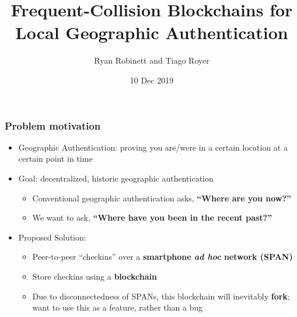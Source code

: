 \documentclass{beamer}
\begin{document}
\captionsetup{font=scriptsize, labelfont=scriptsize}

\title{Frequent-Collision Blockchains for Local Geographic Authentication}
\author{Ryan Robinett and Tiago Royer}
\date{10 Dec 2019}

\begin{frame}
    \titlepage
\end{frame}

\begin{frame}
	\frametitle{Problem motivation}

	\begin{itemize}
		\item Geographic Authentication:
			proving you are/were in a certain location
			at a certain point in time
		\item Goal: decentralized, historic geographic authentication
			\begin{itemize}
				\item Conventional geographic authentication asks, \textbf{``Where are you now?''}
				\item We want to ask, \textbf{``Where have you been in the recent past?''}
			\end{itemize}
		\item Proposed Solution:
			\begin{itemize}
				\item Peer-to-peer ``checkins'' over a \textbf{smartphone
					\textit{ad hoc} network (SPAN)}
				\item Store checkins using a \textbf{blockchain}
				\item Due to disconnectedness of SPANs, this blockchain will
					inevitably \textbf{fork}; want to use this as a feature,
					rather than a bug
			\end{itemize}
	\end{itemize}
\end{frame}
\end{document}
